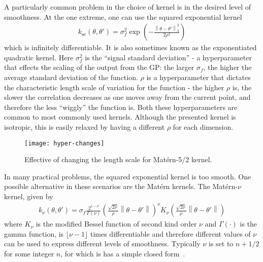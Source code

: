 A particularly common problem in the choice of kernel is in the desired level
of smoothness.  At the one extreme, one can use the squared exponential kernel
\begin{align}
\label{eq:opt:se-kernel}
k_{\text{se}} \left(\theta,\theta'\right) = \sigma_f^2 \exp \left(-\frac{\left\lVert \theta - \theta'\right\rVert^2_2}{2 \rho^2}\right)
\end{align}
which is infinitely differentiable.  It is also sometimes known as
the exponentiated quadratic kernel. Here $\sigma_f^2$ is the ``signal 
standard deviation'' - a hyperparameter that
effects the scaling of the output from the GP: the larger $\sigma_f$, the higher
the average standard deviation of the function.  $\rho$ is a hyperparameter
that dictates the characteristic length scale of variation for the function - the
higher $\rho$ is, the slower the correlation decreases as one moves away from the
current point, and therefore the less ``wiggly'' the function is.  Both these
hyperparameters are common to most commonly used kernels.  Although the
presented kernel is isotropic, this is easily relaxed by having a different $\rho$
for each dimension.

\begin{figure}[t]
	\centering
	\texttt{[image: hyper-changes]}
	\caption{Effective of changing the length scale for Mat\'{e}rn-5/2 kernel.\label{fig:opt:hyper-changes}}
\end{figure}

In many practical problems, the squared exponential kernel is too smooth.
One possible alternative in these scenarios are the Mat\'{e}rn kernels.  The
Mat\'{e}rn-$\nu$ kernel, given by
\begin{align}
k_{\nu}\left(\theta,\theta'\right) = \sigma_f \frac{2^{1-\nu}}{\Gamma\left(\nu\right)}\left(\frac{\sqrt{2\nu}}{\rho}\left\lVert\theta-\theta'\right\rVert\right)^{\nu} K_\nu
 \left(\frac{\sqrt{2\nu}}{\rho}\left\lVert\theta-\theta'\right\rVert\right)
\end{align}
where $K_{\nu}$ is the modified Bessel function of second kind order $\nu$
and $\Gamma(\cdot)$ is the gamma function,
is $\lfloor\nu-1\rfloor$ times differentiable and
therefore different values of $\nu$ can be used to express different levels
of smoothness.  Typically $\nu$ is set to $n+1/2$ for some integer $n$, for
which is has a simple closed form~\citep{rasmussen2006gaussian}.

